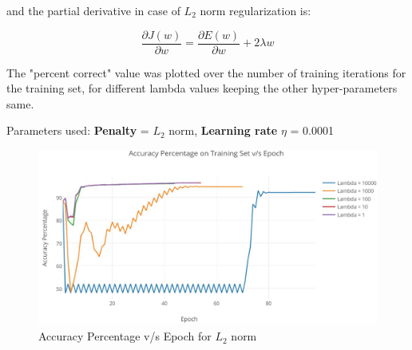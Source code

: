 \documentclass{article}
\begin{document}
and the partial derivative in case of $L_{2}$ norm regularization is:

$$\frac{\partial J(w)}{\partial w} = \frac{\partial E(w)}{\partial w} + 2\lambda w$$

The "percent correct" value was plotted over the number of training iterations for the training set, for different lambda values keeping the other hyper-parameters same. 

Parameters used: \textbf{Penalty} = $L_{2}$ norm, \textbf{Learning rate} $\eta$ = 0.0001

\begin{figure}[h]
  \includegraphics[width=\linewidth]{graphs/5_b_negativeInEqn.JPG}
  \caption{Accuracy Percentage v/s Epoch for $L_{2}$ norm}
  \label{fig:graph 5(b) l2}
\end{figure}
\end{document}
